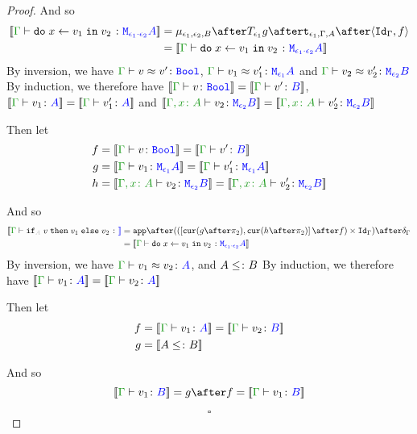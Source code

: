 \documentclass{report}
\begin{document}
\begin{framed}
\begin{proof}
        
        
        And so
        \begin{equation}
            \begin{split}
                \deno{\gtyperelation{\doin{x}{v_1}{v_2}}{\M{\e_1\dot\e_2}{A}}} & = \bind{\e_1}{\e_2}{B} \after \T{\e_1}{g} \after \tstrength{\e_1}{\G}{A} \after \pr{\idg}{f}\\
                 & = \deno{\gtyperelation{\doin{x}{v_1}{v_2}}{\M{\e_1\dot\e_2}{A}}}
            \end{split}
        \end{equation}
        By inversion, we have $\gberelation{v}{v'}{\B}$, $\gberelation{v_1}{v_1'}{\M{\e_1}{A}}$ and $\gberelation{v_2}{v_2'}{\M{\e_2}{B}}$
        By induction, we therefore have $\deno{\gtyperelation{v}{\B}} = \deno{\gtyperelation{v'}{B}}$, $\deno{\gtyperelation{v_1}{ A}}= \deno{\gtyperelation{v_1'}{ A}}$ and $\deno{\typerelation{\gax}{v_2}{\M{\e_2}{B}}} = \deno{\typerelation{\gax}{v_2'}{\M{\e_2}{B}}}$
        
        Then let
        \begin{align*}
            f &{}=\deno{\gtyperelation{v}{\B}} = \deno{\gtyperelation{v'}{B}}\\
            g &{}=\deno{\gtyperelation{v_1}{\M{\e_1}{A}}}= \deno{\gtyperelation{v_1'}{\M{\e_1}{A}}}\\
            h &{}=\deno{\typerelation{\gax}{v_2}{\M{\e_2}{B}}} = \deno{\typerelation{\gax}{v_2'}{\M{\e_2}{B}}}
        \end{align*}
        
        
        
        And so
        \begin{equation}
            \begin{split}
                \deno{\gtyperelation{\pifthenelse{A}{v}{v_1}{v_2}}} & = \ifMorph{f}{g}{h}\\
                 & = \deno{\gtyperelation{\doin{x}{v_1}{v_2}}{\M{\e_1\dot\e_2}{A}}}
            \end{split}
        \end{equation}
        By inversion, we have $\gberelation{v_1}{v_2}{A}$, and $A \leq\colon B$ 
        By induction, we therefore have $\deno{\gtyperelation{v_1}{A}} = \deno{\gtyperelation{v_2}{A}}$
        
        Then let
        \begin{align*}
            f &{}=\deno{\gtyperelation{v_1}{A}} = \deno{\gtyperelation{v_2}{B}}\\
            g &{}=\deno{A \subtype B}
        \end{align*}
        
        
        
        And so
        \begin{equation}
                \deno{\gtyperelation{v_1}{B}} = g \after f = \deno{\gtyperelation{v_1}{B}}
        \end{equation}
        
        $$\square$$
    \end{proof}
\end{framed}
\end{document}
